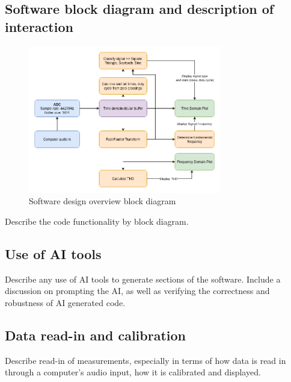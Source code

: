 \documentclass[11pt,a4paper]{article}
\begin{document}
\subsection{Software block diagram and description of interaction}

\begin{figure}[H]
	\begin{center}
		\includegraphics[width=0.75\textwidth]{figures/software/software-design-overview-block-diagram.png}
		\caption{Software design overview block diagram}
		\label{fig:Software design overview block diagram}
	\end{center}
\end{figure}


Describe the code functionality by block diagram.

\subsection{Use of AI tools}

Describe any use of AI tools to generate sections of the software. Include a discussion on prompting the AI, as well as verifying the correctness and robustness of AI generated code.

\subsection{Data read-in and calibration}

Describe read-in of measurements, especially in terms of how data is read in through a computer’s audio input, how it is calibrated and displayed.
\end{document}
